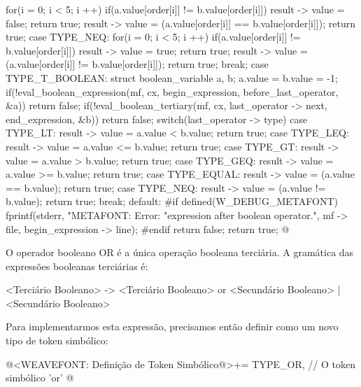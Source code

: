 {{{{{{{{{{{          for(i = 0; i < 5; i ++)
            if(a.value[order[i]] != b.value[order[i]]){
              result -> value = false;
              return true;
            }
          result -> value = (a.value[order[i]] == b.value[order[i]]);
          return true;
        case TYPE_NEQ:
          for(i = 0; i < 5; i ++)
            if(a.value[order[i]] != b.value[order[i]]){
              result -> value = true;
              return true;
            }
          result -> value = (a.value[order[i]] != b.value[order[i]]);
          return true;
      }          
      break;
    }
    case TYPE_T_BOOLEAN:
    {
      struct boolean_variable a, b;
      a.value = b.value = -1;
      if(!eval_boolean_expression(mf, cx, begin_expression,
                                  before_last_operator, &a))
        return false;
      if(!eval_boolean_tertiary(mf, cx, last_operator -> next,
                                end_expression, &b))
        return false;
      switch(last_operator -> type){
      case TYPE_LT:
        result -> value = a.value < b.value;
        return true;
      case TYPE_LEQ:
        result -> value = a.value <= b.value;
        return true;
      case TYPE_GT:
        result -> value = a.value > b.value;
        return true;
      case TYPE_GEQ:
        result -> value = a.value >= b.value;
        return true;
      case TYPE_EQUAL:
        result -> value = (a.value == b.value);
        return true;
      case TYPE_NEQ:
        result -> value = (a.value != b.value);
        return true;
      }
      break;
    }
    default:
#if defined(W_DEBUG_METAFONT)
      fprintf(stderr, "METAFONT: Error: %
              "expression after boolean operator.\n",  mf -> file,
              begin_expression -> line);
#endif
      return false;
    }
    return true;
  }
}
@
\fimcodigo


O operador booleano OR é a única operação booleana terciária. A
gramática das expressões booleanas terciárias é:

\alinhaverbatim
<Terciário Booleano> -> <Terciário Booleano> or <Secundário Booleano> |
                        <Secundário Booleano>
\alinhanormal

Para implementarmos esta expressão, precisamos então
definir  como um novo tipo de token simbólico:

\iniciocodigo
@<WEAVEFONT: Definição de Token Simbólico@>+=
TYPE_OR,                    // O token simbólico 'or'
@
\fimcodigo

}}}}}}
